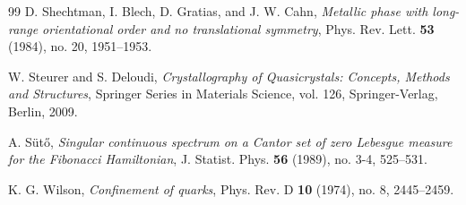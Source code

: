 \documentclass[12pt]{article}
\begin{document}
\begin{thebibliography}{99}
 D. Shechtman, I. Blech, D. Gratias, and J. W. Cahn, \emph{Metallic phase with long-range orientational order and no translational symmetry}, Phys. Rev. Lett. \textbf{53} (1984), no. 20, 1951--1953.

 W. Steurer and S. Deloudi, \emph{Crystallography of Quasicrystals: Concepts, Methods and Structures}, Springer Series in Materials Science, vol. 126, Springer-Verlag, Berlin, 2009.

 A. Sütő, \emph{Singular continuous spectrum on a Cantor set of zero Lebesgue measure for the Fibonacci Hamiltonian}, J. Statist. Phys. \textbf{56} (1989), no. 3-4, 525--531.

 K. G. Wilson, \emph{Confinement of quarks}, Phys. Rev. D \textbf{10} (1974), no. 8, 2445--2459.

\end{thebibliography}
\end{document}
